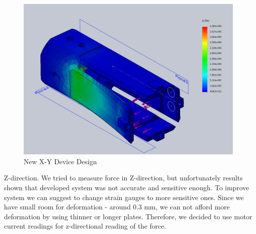 \begin{figure}[h]
	\begin{center}
		\includegraphics[width=120mm]{fig/methods/NEW_SLEEVE_STRAIN.png}
	\end{center}
	\vspace{-4mm}
	\caption[New X-Y Device Design]
	{New X-Y Device Design}
	\label{fig:NewXYDesign}
	\vspace{-2mm}
\end{figure}

Z-direction. We tried to measure force in Z-direction, but unfortunately results shown that developed system was not accurate and sensitive enough. To improve system we can suggest to change strain gauges to more sensitive ones. Since we have small room for deformation - around 0.3 mm, we can not afford more deformation by using thinner or longer plates. Therefore, we decided to use motor current readings for z-directional reading of the force.

